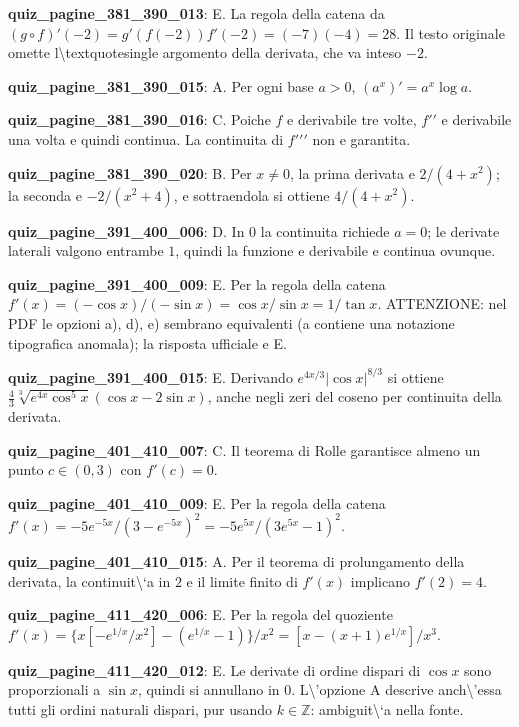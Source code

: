 \documentclass[11pt,a4paper]{article}
\newcounter{quiz}
\begin{document}
\noindent\textbf{quiz\_pagine\_381\_390\_013}: E. La regola della catena da $(g\circ f)\prime(-2)=g\prime(f(-2))f\prime(-2)=(-7)(-4)=28$. Il testo originale omette l\textbackslash{}textquotesingle argomento della derivata, che va inteso $-2$.\par\medskip
\noindent\textbf{quiz\_pagine\_381\_390\_015}: A. Per ogni base $a>0$, $(a^x)\prime=a^x\log a$.\par\medskip
\noindent\textbf{quiz\_pagine\_381\_390\_016}: C. Poiche $f$ e derivabile tre volte, $f\prime\prime$ e derivabile una volta e quindi continua. La continuita di $f\prime\prime\prime$ non e garantita.\par\medskip
\noindent\textbf{quiz\_pagine\_381\_390\_020}: B. Per $x\neq0$, la prima derivata e $2/(4+x^2)$; la seconda e $-2/(x^2+4)$, e sottraendola si ottiene $4/(4+x^2)$.\par\medskip
\noindent\textbf{quiz\_pagine\_391\_400\_006}: D. In $0$ la continuita richiede $a=0$; le derivate laterali valgono entrambe $1$, quindi la funzione e derivabile e continua ovunque.\par\medskip
\noindent\textbf{quiz\_pagine\_391\_400\_009}: E. Per la regola della catena $f\prime(x)=(-\cos x)/(-\sin x)=\cos x/\sin x=1/\tan x$. ATTENZIONE: nel PDF le opzioni a), d), e) sembrano equivalenti (a contiene una notazione tipografica anomala); la risposta ufficiale e E.\par\medskip
\noindent\textbf{quiz\_pagine\_391\_400\_015}: E. Derivando $e^{4x/3}|\cos x|^{8/3}$ si ottiene $\frac43\sqrt[3]{e^{4x}\cos^5x}(\cos x-2\sin x)$, anche negli zeri del coseno per continuita della derivata.\par\medskip
\noindent\textbf{quiz\_pagine\_401\_410\_007}: C. Il teorema di Rolle garantisce almeno un punto $c\in(0,3)$ con $f\prime(c)=0$.\par\medskip
\noindent\textbf{quiz\_pagine\_401\_410\_009}: E. Per la regola della catena $f\prime(x)=-5e^{-5x}/(3-e^{-5x})^2=-5e^{5x}/(3e^{5x}-1)^2$.\par\medskip
\noindent\textbf{quiz\_pagine\_401\_410\_015}: A. Per il teorema di prolungamento della derivata, la continuit\textbackslash{}`a in $2$ e il limite finito di $f\prime(x)$ implicano $f\prime(2)=4$.\par\medskip
\noindent\textbf{quiz\_pagine\_411\_420\_006}: E. Per la regola del quoziente $f\prime(x)=\{x[-e^{1/x}/x^2]-(e^{1/x}-1)\}/x^2=[x-(x+1)e^{1/x}]/x^3$.\par\medskip
\noindent\textbf{quiz\_pagine\_411\_420\_012}: E. Le derivate di ordine dispari di $\cos x$ sono proporzionali a $\sin x$, quindi si annullano in $0$. L\textbackslash{}'opzione A descrive anch\textbackslash{}'essa tutti gli ordini naturali dispari, pur usando $k\in\mathbb Z$: ambiguit\textbackslash{}`a nella fonte.\par\medskip
\end{document}
